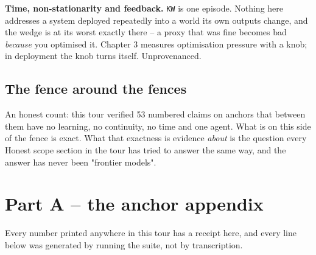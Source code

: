 \textbf{Time, non-stationarity and feedback.} \texttt{KW} is one episode. Nothing here addresses a system deployed repeatedly into a world its own outputs change, and the wedge is at its worst exactly there -- a proxy that was fine becomes bad \emph{because} you optimised it. Chapter 3 measures optimisation pressure with a knob; in deployment the knob turns itself. Unprovenanced.

\section*{The fence around the fences}

An honest count: this tour verified 53 numbered claims on anchors that between them have no learning, no continuity, no time and one agent. What is on this side of the fence is exact. What that exactness is evidence \emph{about} is the question every Honest scope section in the tour has tried to answer the same way, and the answer has never been "frontier models".

\chapter*{Part A -- the anchor appendix}

Every number printed anywhere in this tour has a receipt here, and every line below was generated by running the suite, not by transcription.

\noindent

